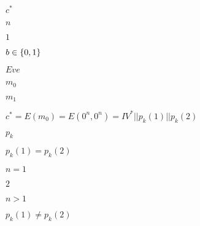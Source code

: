 \documentclass[10pt]{book}
\begin{document}
\begin{mdSnippets}
\begin{mdInlineSnippet}
$c^*$\end{mdInlineSnippet}%
\begin{mdInlineSnippet}[7b8b965ad4bca0e41ab51de7b31363a1]%
$n$\end{mdInlineSnippet}%
\begin{mdInlineSnippet}[c4ca4238a0b923820dcc509a6f75849b]%
$1$\end{mdInlineSnippet}%
\begin{mdInlineSnippet}[6892f7e7c3b8ecc19e4a077e82515567]%
$b \in \{0,1\}$\end{mdInlineSnippet}%
\begin{mdInlineSnippet}%
$Eve$\end{mdInlineSnippet}%
\begin{mdInlineSnippet}[fed1e4775925bd3f7af0c5d8fc47e4e6]%
$m_0$\end{mdInlineSnippet}%
\begin{mdInlineSnippet}%
$m_1$\end{mdInlineSnippet}%
\begin{mdInlineSnippet}[17b01a9d0bb8191a196ef25b34a97f24]%
$c^* = E(m_0) = E(0^n, 0^n) = IV^* || p_k(1) || p_k(2)$\end{mdInlineSnippet}%
\begin{mdInlineSnippet}%
$p_k$\end{mdInlineSnippet}%
\begin{mdInlineSnippet}%
$p_k(1) = p_k(2)$\end{mdInlineSnippet}%
\begin{mdInlineSnippet}[ab78ccfbcd04b1ba22eb9427251cb20d]%
$n = 1$\end{mdInlineSnippet}%
\begin{mdInlineSnippet}[c81e728d9d4c2f636f067f89cc14862c]%
$2$\end{mdInlineSnippet}%
\begin{mdInlineSnippet}[b5483f2f1af0ee56acb54ef669929a57]%
$n > 1$\end{mdInlineSnippet}%
\begin{mdInlineSnippet}%
$p_k(1) \neq p_k(2)$\end{mdInlineSnippet}%

\end{mdSnippets}
\end{document}
